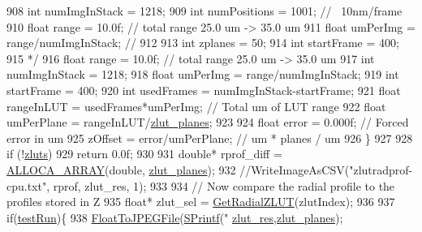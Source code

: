 \begin{DoxyCode}
{{{{{908 \textcolor{comment}{            int numImgInStack = 1218;}
909 \textcolor{comment}{            int numPositions = 1001; // ~10nm/frame}
910 \textcolor{comment}{            float range = 10.0f; // total range 25.0 um -> 35.0 um}
911 \textcolor{comment}{            float umPerImg = range/numImgInStack; //}
912 \textcolor{comment}{            }
913 \textcolor{comment}{            int zplanes = 50;}
914 \textcolor{comment}{            int startFrame = 400;}
915 \textcolor{comment}{        */}
916         \textcolor{keywordtype}{float} range = 10.0f; \textcolor{comment}{// total range 25.0 um -> 35.0 um}
917         \textcolor{keywordtype}{int} numImgInStack = 1218;
918         \textcolor{keywordtype}{float} umPerImg = range/numImgInStack;
919         \textcolor{keywordtype}{int} startFrame = 400;
920         \textcolor{keywordtype}{int} usedFrames = numImgInStack-startFrame;
921         \textcolor{keywordtype}{float} rangeInLUT = usedFrames*umPerImg; \textcolor{comment}{// Total um of LUT range}
922         \textcolor{keywordtype}{float} umPerPlane = rangeInLUT/\hyperlink{class_c_p_u_tracker_ad28d60ad587ae3f89b9dba7f82c135f7}{zlut\_planes};
923 
924         \textcolor{keywordtype}{float} error = 0.000f; \textcolor{comment}{// Forced error in um}
925         zOffset = error/umPerPlane; \textcolor{comment}{// um * planes / um}
926     \}
927 
928     \textcolor{keywordflow}{if} (!\hyperlink{class_c_p_u_tracker_ac187d3124a66c6743c2037bb82d9a67d}{zluts})
929         \textcolor{keywordflow}{return} 0.0f;
930 
931     \textcolor{keywordtype}{double}* rprof\_diff = \hyperlink{std__incl_8h_a37dbccb865134ee3a70c5044b365ded7}{ALLOCA\_ARRAY}(\textcolor{keywordtype}{double}, \hyperlink{class_c_p_u_tracker_ad28d60ad587ae3f89b9dba7f82c135f7}{zlut\_planes});
932     \textcolor{comment}{//WriteImageAsCSV("zlutradprof-cpu.txt", rprof, zlut\_res, 1);}
933 
934     \textcolor{comment}{// Now compare the radial profile to the profiles stored in Z}
935     \textcolor{keywordtype}{float}* zlut\_sel = \hyperlink{class_c_p_u_tracker_a8a8ca2636eca91688ff90d68d04ad69d}{GetRadialZLUT}(zlutIndex);
936 
937     \textcolor{keywordflow}{if}(\hyperlink{class_c_p_u_tracker_a5dd04ccf64ee6885b2dc272553c29644}{testRun})\{
938         \hyperlink{fastjpg_8cpp_a197d79f00fb185491c4d109e966ca9ef}{FloatToJPEGFile}(\hyperlink{utils_8cpp_aba26a6b64035ef7962a63b760dd9013e}{SPrintf}(\textcolor{stringliteral}{"%
      \hyperlink{class_c_p_u_tracker_a058eae282c9bf847cd8e39664688c5bc}{zlut\_res},\hyperlink{class_c_p_u_tracker_ad28d60ad587ae3f89b9dba7f82c135f7}{zlut\_planes});
}}}}}}
\end{DoxyCode}

